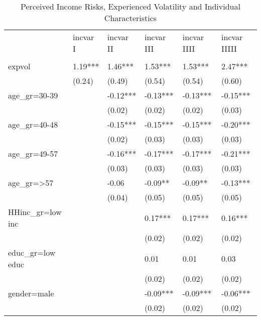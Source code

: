 \begin{table}[p]
\centering
\begin{adjustbox}{width=\textwidth}
\begin{threeparttable}
\caption{Perceived Income Risks, Experienced Volatility and Individual Characteristics}
\label{micro_reg}\begin{tabular}{llllll}
\toprule
{} & incvar I & incvar II & incvar III & incvar IIII & incvar IIIII \\
                 &          &           &            &             &              \\
\midrule
expvol           &  1.19*** &   1.46*** &    1.53*** &     1.53*** &      2.47*** \\
                 &   (0.24) &    (0.49) &     (0.54) &      (0.54) &       (0.60) \\
age\_gr=30-39     &          &  -0.12*** &   -0.13*** &    -0.13*** &     -0.15*** \\
                 &          &    (0.02) &     (0.02) &      (0.02) &       (0.03) \\
age\_gr=40-48     &          &  -0.15*** &   -0.15*** &    -0.15*** &     -0.20*** \\
                 &          &    (0.02) &     (0.03) &      (0.03) &       (0.03) \\
age\_gr=49-57     &          &  -0.16*** &   -0.17*** &    -0.17*** &     -0.21*** \\
                 &          &    (0.03) &     (0.03) &      (0.03) &       (0.03) \\
age\_gr=>57       &          &     -0.06 &    -0.09** &     -0.09** &     -0.13*** \\
                 &          &    (0.04) &     (0.05) &      (0.05) &       (0.05) \\
HHinc\_gr=low inc &          &           &    0.17*** &     0.17*** &      0.16*** \\
                 &          &           &     (0.02) &      (0.02) &       (0.02) \\
educ\_gr=low educ &          &           &       0.01 &        0.01 &         0.03 \\
                 &          &           &     (0.02) &      (0.02) &       (0.02) \\
gender=male      &          &           &   -0.09*** &    -0.09*** &     -0.06*** \\
                 &          &           &     (0.02) &      (0.02) &       (0.02) \\

\end{tabular}
\end{threeparttable}
\end{adjustbox}
\end{table}
